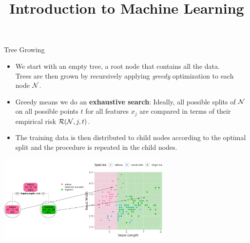 \documentclass[11pt,compress,t,notes=noshow, xcolor=table]{beamer}
\title{Introduction to Machine Learning}
\institute{\href{https://compstat-lmu.github.io/lecture_i2ml/}{compstat-lmu.github.io/lecture\_i2ml}}
\date{}
\begin{document}
\sloppy

\begin{vbframe}{Tree Growing}

\begin{itemize}

\item We start with an empty tree, a root node that contains all the data.\\
Trees are then grown by recursively applying \emph{greedy} optimization to each node $\mathcal{N}$.

\item Greedy means we do an \textbf{exhaustive search}: Ideally, all possible splits of $\mathcal{N}$ on all possible points $t$ for all features $x_j$ are compared in terms of their empirical risk $\mathcal{R}(\mathcal{N}, j, t)$. 

\item The training data is then distributed to child nodes according to the optimal split and the procedure is repeated in the child nodes.

\end{itemize}

\color{fgcolor}

{\centering \includegraphics[width=0.65\textwidth]{figure/tree-classif-depth1-ann.pdf} 

}

\end{vbframe}
\end{document}
